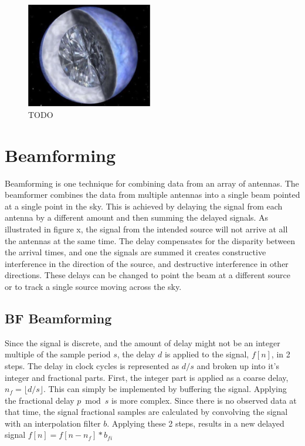 \begin{figure}
  \centering
    \includegraphics[width=0.49\textwidth]{Images/C2/diamond_planet.png}
  \caption{TODO}
  \label{fig: C2/diamond_planet.png}
\end{figure}


\section{Beamforming}
\label{Real Time Radio Astronomy Algorithms:Beamforming}
Beamforming is one technique for combining data from an array of antennas.
The beamformer combines the data from multiple antennas into a single beam pointed at a single point in the sky.
This is achieved by delaying the signal from each antenna by a different amount and then summing the delayed signals. 
As illustrated in figure x, %
the signal from the intended source will not arrive at all the antennas at the same time. 
The delay compensates for the disparity between the arrival times, and one the signals are summed it creates constructive interference in the direction of the source, and destructive interference in other directions. 
These delays can be changed to point the beam at a different source or to track a single source moving across the sky.


\subsection{BF Beamforming}
Since the signal is discrete, and the amount of delay might not be an integer multiple of the sample period $s$, the delay $d$ is applied to the signal, $f[n]$, in 2 steps. 
The delay in clock cycles is represented as $d/s$ and broken up into it's integer and fractional parts. 
First, the integer part is applied as a coarse delay, $n_f = \lfloor d/s \rfloor$. 
This can simply be implemented by buffering the signal.
Applying the  fractional delay $p \bmod s$ is more complex. 
Since there is no observed data at that time, the signal fractional samples are calculated by convolving the signal with an interpolation filter $b$.
Applying these 2 steps, results in a new delayed signal $f[n] = f[n-n_f]\ast b_{fi}$


